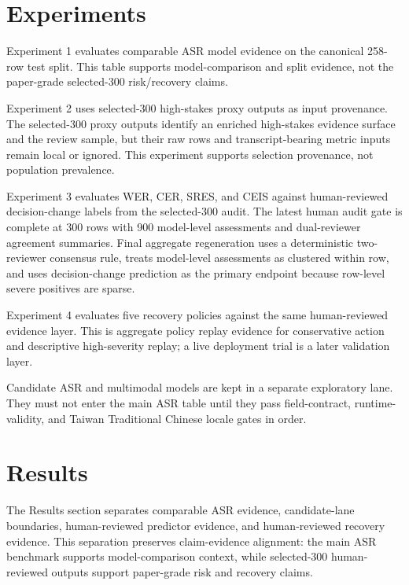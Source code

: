\documentclass[
]{article}
\begin{document}
\hypertarget{experiments}{%
\section{Experiments}\label{experiments}}

Experiment 1 evaluates comparable ASR model evidence on the canonical
258-row test split. This table supports model-comparison and split
evidence, not the paper-grade selected-300 risk/recovery claims.

Experiment 2 uses selected-300 high-stakes proxy outputs as input
provenance. The selected-300 proxy outputs identify an enriched
high-stakes evidence surface and the review sample, but their raw rows
and transcript-bearing metric inputs remain local or ignored. This
experiment supports selection provenance, not population prevalence.

Experiment 3 evaluates WER, CER, SRES, and CEIS against human-reviewed
decision-change labels from the selected-300 audit. The latest human
audit gate is complete at 300 rows with 900 model-level assessments and
dual-reviewer agreement summaries. Final aggregate regeneration uses a
deterministic two-reviewer consensus rule, treats model-level
assessments as clustered within row, and uses decision-change prediction
as the primary endpoint because row-level severe positives are sparse.

Experiment 4 evaluates five recovery policies against the same
human-reviewed evidence layer. This is aggregate policy replay evidence
for conservative action and descriptive high-severity replay; a live
deployment trial is a later validation layer.

Candidate ASR and multimodal models are kept in a separate exploratory
lane. They must not enter the main ASR table until they pass
field-contract, runtime-validity, and Taiwan Traditional Chinese locale
gates in order.

\hypertarget{results}{%
\section{Results}\label{results}}

The Results section separates comparable ASR evidence, candidate-lane
boundaries, human-reviewed predictor evidence, and human-reviewed
recovery evidence. This separation preserves claim-evidence alignment:
the main ASR benchmark supports model-comparison context, while
selected-300 human-reviewed outputs support paper-grade risk and
recovery claims.
\end{document}
